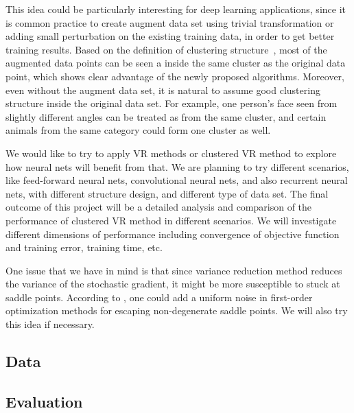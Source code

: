 \documentclass{article} %
\begin{document}
This idea could be particularly interesting for deep learning applications, since it is common practice to create augment data set using trivial transformation or adding small perturbation on the existing training data, in order to get better training results. Based on the definition of clustering structure~\cite{exploitingstructure}, most of the augmented data points can be seen a inside the same cluster as the original data point, which shows clear advantage of the newly proposed algorithms. Moreover, even without the augment data set, it is natural to assume good clustering structure inside the original data set. For example, one person's face seen from slightly different angles can be treated as from the same cluster, and certain animals from the same category could form one cluster as well. 


We would like to try to apply VR methods or clustered VR method to explore how neural nets will benefit from that. We are planning to try different scenarios, like feed-forward neural nets, convolutional neural nets, and also recurrent neural nets, with different structure design, and different type of data set. The final outcome of this project will be a detailed analysis and comparison of the performance of clustered VR method in different scenarios. We will investigate different dimensions of performance including convergence of objective function and training error, training time, etc. 

One issue that we have in mind is that since variance reduction method reduces the variance of the stochastic gradient, it might be more susceptible to stuck at saddle points. According to \cite{escapesaddle}, one could add a uniform noise in first-order optimization methods for escaping non-degenerate saddle points. We will also try this idea if necessary.

\subsection{Data}
\subsection{Evaluation}




\end{document}
